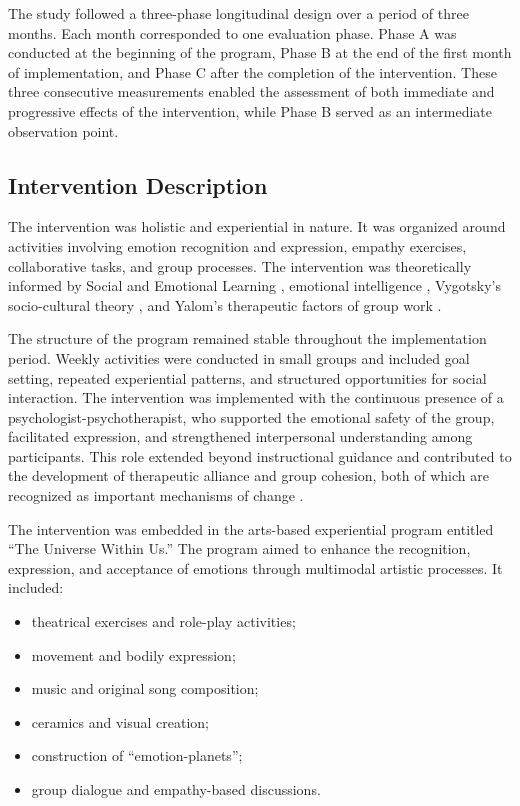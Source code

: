 \documentclass[journal]{IEEEtran}
\begin{document}
The study followed a three-phase longitudinal design over a period of three months. Each month corresponded to one evaluation phase. Phase A was conducted at the beginning of the program, Phase B at the end of the first month of implementation, and Phase C after the completion of the intervention. These three consecutive measurements enabled the assessment of both immediate and progressive effects of the intervention, while Phase B served as an intermediate observation point.

\subsection{Intervention Description}

The intervention was holistic and experiential in nature. It was organized around activities involving emotion recognition and expression, empathy exercises, collaborative tasks, and group processes. The intervention was theoretically informed by Social and Emotional Learning \cite{casel2020}, emotional intelligence \cite{goleman1995}, Vygotsky's socio-cultural theory \cite{vygotsky1978}, and Yalom's therapeutic factors of group work \cite{yalom2005}.

The structure of the program remained stable throughout the implementation period. Weekly activities were conducted in small groups and included goal setting, repeated experiential patterns, and structured opportunities for social interaction. The intervention was implemented with the continuous presence of a psychologist-psychotherapist, who supported the emotional safety of the group, facilitated expression, and strengthened interpersonal understanding among participants. This role extended beyond instructional guidance and contributed to the development of therapeutic alliance and group cohesion, both of which are recognized as important mechanisms of change \cite{norcross2019,burlingame2011}.

The intervention was embedded in the arts-based experiential program entitled ``The Universe Within Us.'' The program aimed to enhance the recognition, expression, and acceptance of emotions through multimodal artistic processes. It included:

\begin{itemize}
    \item theatrical exercises and role-play activities;
    \item movement and bodily expression;
    \item music and original song composition;
    \item ceramics and visual creation;
    \item construction of ``emotion-planets'';
    \item group dialogue and empathy-based discussions.
\end{itemize}
\end{document}
